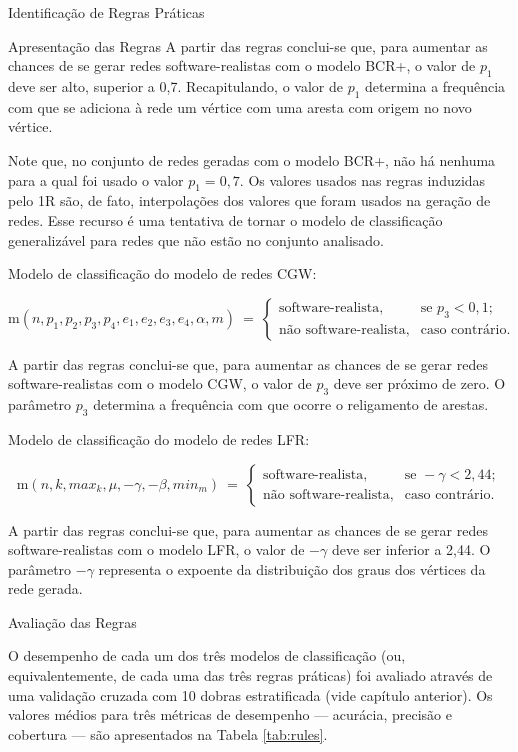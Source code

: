 \begin{section}{Identificação de Regras Práticas}
\begin{subsection}{Apresentação das Regras}
	A partir das regras conclui-se que, para aumentar as chances de se gerar redes software-realistas com o modelo BCR+, o valor de $p_1$ deve ser alto, superior a 0,7. Recapitulando, o valor de $p_1$ determina a frequência com que se adiciona à rede um vértice com uma aresta com origem no novo vértice.
	
	Note que, no conjunto de redes geradas com o modelo BCR+, não há nenhuma para a qual foi usado o valor $p_1 = 0,7$. Os valores usados nas regras induzidas pelo 1R são, de fato, interpolações dos valores que foram usados na geração de redes. Esse recurso é uma tentativa de tornar o modelo de classificação generalizável para redes que não estão no conjunto analisado.
	
	Modelo de classificação do modelo de redes CGW:
	
	$$
	\mathrm{m}(n, p_1, p_2, p_3, p_4, e_1, e_2, e_3, e_4, \alpha, m) ~=~
	\left\{
	\begin{array}{cl}
	\mbox{software-realista,} & \mbox{se } p_3 < 0,1; \\
	\mbox{não software-realista,} & \mbox{caso contrário.}
	\end{array}
	\right.
	$$
	
		A partir das regras conclui-se que, para aumentar as chances de se gerar redes software-realistas com o modelo CGW, o valor de $p_3$ deve ser próximo de zero. O parâmetro $p_3$ determina a frequência com que ocorre o religamento de arestas. 
	
	Modelo de classificação do modelo de redes LFR:

	$$
	\mathrm{m}(n, k, max_k, \mu, -\gamma, -\beta, min_m) ~=~
	\left\{
	\begin{array}{cl}
	\mbox{software-realista,} & \mbox{se } -\gamma < 2,44; \\
	\mbox{não software-realista,} & \mbox{caso contrário.}
	\end{array}
	\right.
	$$
	
	A partir das regras conclui-se que, para aumentar as chances de se gerar redes software-realistas com o modelo LFR, o valor de $-\gamma$ deve ser inferior a 2,44. O parâmetro $-\gamma$ representa o expoente da distribuição dos graus dos vértices da rede gerada.
	
\end{subsection}
	
\begin{subsection}{Avaliação das Regras}
	
\end{subsection}
	O desempenho de cada um dos três modelos de classificação (ou, equivalentemente, de cada uma das três regras práticas) foi avaliado através de uma validação cruzada com 10 dobras estratificada (vide capítulo anterior). Os valores médios para três métricas de desempenho --- acurácia, precisão e cobertura --- são apresentados na Tabela \ref{tab:rules}.
	

\end{section}
